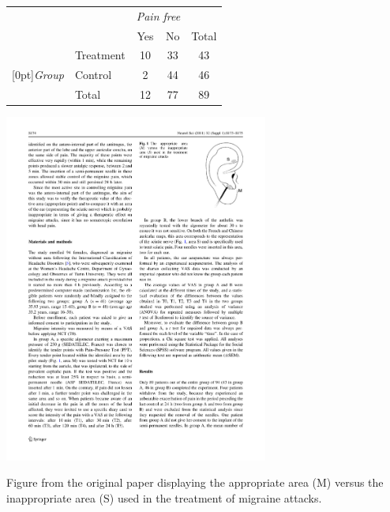 {	\noindent\begin{minipage}[l]{0.4\textwidth}
		\begin{tabular}{ll  cc c} 
			&           & \multicolumn{2}{c}{\textit{Pain free}} \\
			\cline{3-4}
			&			& Yes 	& No 	                  & Total \\
			\cline{2-5}
			& Treatment 	& 10	 	& 33		                  & 43 \\
			\raisebox{1.5ex}[0pt]{\emph{Group}} & Control	 	& 2	 	& 44 	 	                  & 46 \\
			\cline{2-5}
			& Total		& 12		& 77		                  & 89
		\end{tabular}
	\end{minipage}
	\begin{minipage}[c]{0.05\textwidth}
	\end{minipage}
	\begin{minipage}[c]{0.27\textwidth}
		\begin{center}
			\includegraphics[width = 0.65\textwidth]{ch_data_collection/figures/eoce/migraine_and_acupuncture_intro/earacupuncture.pdf}
		\end{center}
	\end{minipage}
	\begin{minipage}[c]{0.25\textwidth}
		{\footnotesize Figure from the original paper displaying the appropriate area 
			(M) versus the inappropriate area (S) used in the treatment of migraine attacks.}
	\end{minipage}
}
